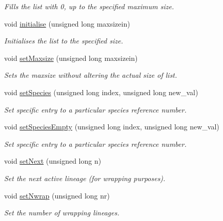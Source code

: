\begin{DoxyCompactItemize}
\begin{DoxyCompactList}\small\item\em Fills the list with 0, up to the specified maximum size. \end{DoxyCompactList}\item 
void \hyperlink{class_species_list_ab36fdc058217514e66e6152479dfab8d}{initialise} (unsigned long maxsizein)
\begin{DoxyCompactList}\small\item\em Initialises the list to the specified size. \end{DoxyCompactList}\item 
void \hyperlink{class_species_list_a8532bddc8397cf50531639c50cccbef3}{set\+Maxsize} (unsigned long maxsizein)
\begin{DoxyCompactList}\small\item\em Sets the maxsize without altering the actual size of list. \end{DoxyCompactList}\item 
void \hyperlink{class_species_list_a98f19fa65ed7cbe4536342ce2dff2b7b}{set\+Species} (unsigned long index, unsigned long new\+\_\+val)
\begin{DoxyCompactList}\small\item\em Set specific entry to a particular species reference number. \end{DoxyCompactList}\item 
void \hyperlink{class_species_list_a49854bb6392a5898fc277f4d2cf1f385}{set\+Species\+Empty} (unsigned long index, unsigned long new\+\_\+val)
\begin{DoxyCompactList}\small\item\em Set specific entry to a particular species reference number. \end{DoxyCompactList}\item 
void \hyperlink{class_species_list_a627f9d95948f4a2cb6cfb3d8b8f9f2ea}{set\+Next} (unsigned long n)
\begin{DoxyCompactList}\small\item\em Set the next active lineage (for wrapping purposes). \end{DoxyCompactList}\item 
void \hyperlink{class_species_list_ad3f8f91e3983b8829c0b405013b2709e}{set\+Nwrap} (unsigned long nr)
\begin{DoxyCompactList}\small\item\em Set the number of wrapping lineages. \end{DoxyCompactList}\item 

\end{DoxyCompactItemize}
